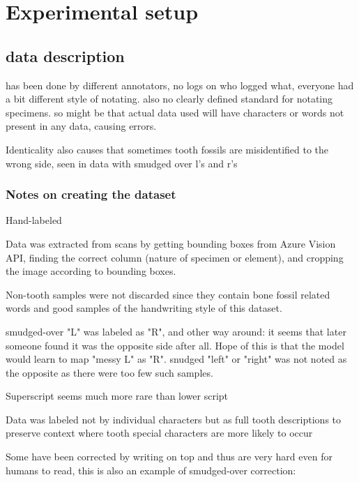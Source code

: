 \documentclass{article}
\begin{document}

\section{Experimental setup}


\subsection{data description}

has been done by different annotators, no logs on who logged what, everyone 
had a bit different style of notating. also no clearly defined standard 
for notating specimens. so might be that actual data used will have 
characters or words not present in any data, causing errors.


Identicality also causes that sometimes tooth fossils are misidentified to 
the wrong side, seen in data with smudged over l's and r's

\subsubsection{Notes on creating the dataset}

Hand-labeled

Data was extracted from scans by getting bounding boxes from Azure Vision API,
finding the correct column (nature of specimen or element), and cropping the image 
according to bounding boxes.

Non-tooth samples were not discarded since they contain 
bone fossil related words and good samples of the handwriting style of this dataset.

smudged-over "L" was labeled as "R", and other way around: it seems that later 
someone found it was the opposite side after all. Hope of this is that the model 
would learn to map "messy L" as "R". snudged "left" or "right" was not noted as the 
opposite as there were too few such samples.

Superscript seems much more rare than lower script

Data was labeled not by individual characters but as full tooth descriptions
to preserve context where tooth special characters are more likely to occur

Some have been corrected by writing on top and thus are very hard 
even for humans to read, this is also an example of smudged-over correction: 
\end{document}
